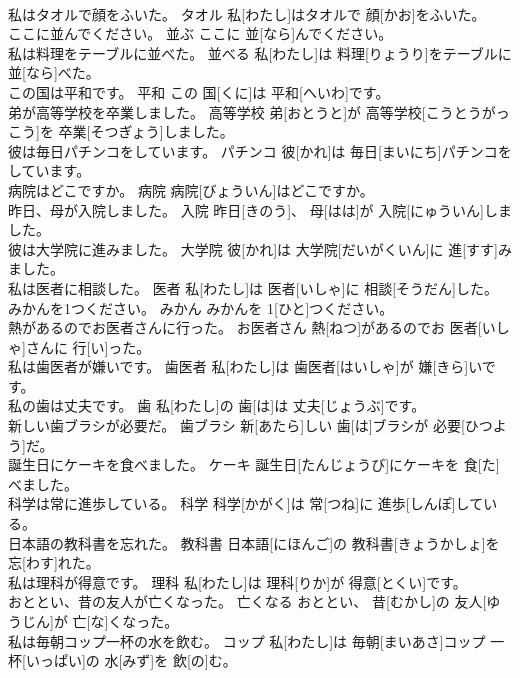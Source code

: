 \documentclass[8pt]{extreport}
\begin{document}
\begin{CJK}{UTF8}{min}
\\	私はタオルで顔をふいた。	タオル	私[わたし]はタオルで 顔[かお]をふいた。	
\\	ここに並んでください。	並ぶ	ここに 並[なら]んでください。	
\\	私は料理をテーブルに並べた。	並べる	私[わたし]は 料理[りょうり]をテーブルに 並[なら]べた。	
\\	この国は平和です。	平和	この 国[くに]は 平和[へいわ]です。	
\\	弟が高等学校を卒業しました。	高等学校	弟[おとうと]が 高等学校[こうとうがっこう]を 卒業[そつぎょう]しました。	
\\	彼は毎日パチンコをしています。	パチンコ	彼[かれ]は 毎日[まいにち]パチンコをしています。	
\\	病院はどこですか。	病院	病院[びょういん]はどこですか。	
\\	昨日、母が入院しました。	入院	昨日[きのう]、 母[はは]が 入院[にゅういん]しました。	
\\	彼は大学院に進みました。	大学院	彼[かれ]は 大学院[だいがくいん]に 進[すす]みました。	
\\	私は医者に相談した。	医者	私[わたし]は 医者[いしゃ]に 相談[そうだん]した。	
\\	みかんを1つください。	みかん	みかんを 1[ひと]つください。	
\\	熱があるのでお医者さんに行った。	お医者さん	熱[ねつ]があるのでお 医者[いしゃ]さんに 行[い]った。	
\\	私は歯医者が嫌いです。	歯医者	私[わたし]は 歯医者[はいしゃ]が 嫌[きら]いです。	
\\	私の歯は丈夫です。	歯	私[わたし]の 歯[は]は 丈夫[じょうぶ]です。	
\\	新しい歯ブラシが必要だ。	歯ブラシ	新[あたら]しい 歯[は]ブラシが 必要[ひつよう]だ。	
\\	誕生日にケーキを食べました。	ケーキ	誕生日[たんじょうび]にケーキを 食[た]べました。	
\\	科学は常に進歩している。	科学	科学[かがく]は 常[つね]に 進歩[しんぽ]している。	
\\	日本語の教科書を忘れた。	教科書	日本語[にほんご]の 教科書[きょうかしょ]を 忘[わす]れた。	
\\	私は理科が得意です。	理科	私[わたし]は 理科[りか]が 得意[とくい]です。	
\\	おととい、昔の友人が亡くなった。	亡くなる	おととい、 昔[むかし]の 友人[ゆうじん]が 亡[な]くなった。	
\\	私は毎朝コップ一杯の水を飲む。	コップ	私[わたし]は 毎朝[まいあさ]コップ 一杯[いっぱい]の 水[みず]を 飲[の]む。	

\end{CJK}
\end{document}
